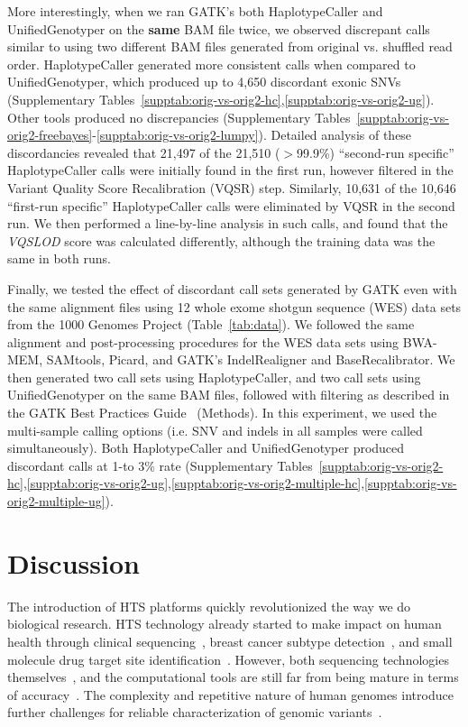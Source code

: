 \documentclass[10pt,a4paper]{article}
\begin{document}
More interestingly, when we ran GATK's both HaplotypeCaller and UnifiedGenotyper on the {\bf same} BAM file twice, we observed discrepant calls similar to using two different BAM files generated from original vs. shuffled read order. HaplotypeCaller generated more consistent calls when compared to UnifiedGenotyper, which produced up to 4,650 discordant exonic SNVs (Supplementary Tables~\ref{supptab:orig-vs-orig2-hc},\ref{supptab:orig-vs-orig2-ug}). Other tools produced no discrepancies (Supplementary Tables~\ref{supptab:orig-vs-orig2-freebayes}-\ref{supptab:orig-vs-orig2-lumpy}).
Detailed analysis of these discordancies revealed that  21,497 of the 21,510 ($>$99.9\%) ``second-run specific'' HaplotypeCaller calls were initially found in the first run, however filtered in the Variant Quality Score Recalibration (VQSR) step. Similarly, 10,631 of the 10,646 ``first-run specific'' HaplotypeCaller calls were eliminated by VQSR in the second run. We then performed a line-by-line analysis in such calls, and found that the {\it VQSLOD} score was calculated differently, although the training data was the same in both runs.

Finally, we tested the effect of discordant call sets generated by GATK even with the same alignment files using 12 whole exome shotgun sequence (WES) data sets from the 1000 Genomes Project (Table~\ref{tab:data}). We followed the same alignment and post-processing procedures for the WES data sets using BWA-MEM, SAMtools, Picard, and GATK's IndelRealigner and BaseRecalibrator. We then generated two call sets using HaplotypeCaller, and two call sets using UnifiedGenotyper on the same BAM files, followed with filtering as described in the GATK Best Practices Guide~\cite{VanderAuwera2013} (Methods). In this experiment, we used the multi-sample calling options (i.e. SNV and indels in all samples were called simultaneously). Both HaplotypeCaller and UnifiedGenotyper produced discordant calls at 1-to 3\% rate
(Supplementary Tables~\ref{supptab:orig-vs-orig2-hc},\ref{supptab:orig-vs-orig2-ug},\ref{supptab:orig-vs-orig2-multiple-hc},\ref{supptab:orig-vs-orig2-multiple-ug}). 

\section{Discussion}

The introduction of HTS platforms  quickly revolutionized the way we do biological research\cite{Mardis2008,Metzker2010}. HTS technology  already started to make impact on human health
through clinical sequencing~\cite{Biesecker2009}, breast cancer subtype detection~\cite{Bosdet2013}, and small molecule drug target site identification~\cite{Rodriguez2014}. However, both sequencing technologies themselves~\cite{Kavak2015}, and the computational tools are still far from being mature in terms of accuracy~\cite{Alkan2011,Nielsen2011}. The complexity and repetitive nature of human genomes introduce further challenges for reliable characterization of genomic variants~\cite{Treangen2012}.
\end{document}
